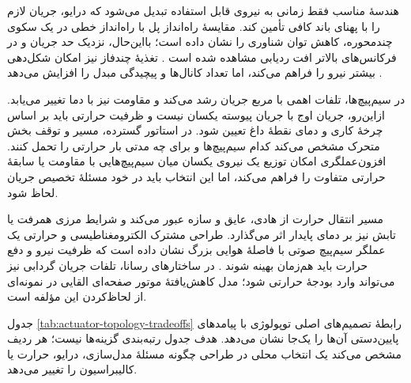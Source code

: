 هندسهٔ مناسب فقط زمانی به نیروی قابل استفاده تبدیل می‌شود که درایو، جریان لازم را با پهنای باند کافی تأمین کند. مقایسهٔ راه‌انداز پل  با راه‌انداز خطی در یک سکوی چندمحوره، کاهش توان شناوری را نشان داده است؛ بااین‌حال، نزدیک حد جریان و در فرکانس‌های بالاتر افت ردیابی مشاهده شده است \cite{huangLowcostHighefficiencyMagnetic2026}. تغذیهٔ چندفاز نیز امکان شکل‌دهی بیشتر نیرو را فراهم می‌کند، اما تعداد کانال‌ها و پیچیدگی مبدل را افزایش می‌دهد \cite{ramettiAnalysisMultiphaseSinglesided2025}.

در سیم‌پیچ‌ها، تلفات اهمی با مربع جریان رشد می‌کند و مقاومت نیز با دما تغییر می‌یابد. ازاین‌رو، جریان اوج با جریان پیوسته یکسان نیست و ظرفیت حرارتی باید بر اساس چرخهٔ کاری و دمای نقطهٔ داغ تعیین شود. در استاتور گسترده، مسیر و توقف بخش متحرک مشخص می‌کند کدام سیم‌پیچ‌ها و برای چه مدتی بار حرارتی را تحمل کنند. افزون‌عملگری امکان توزیع یک نیروی یکسان میان سیم‌پیچ‌هایی با مقاومت یا سابقهٔ حرارتی متفاوت را فراهم می‌کند، اما این انتخاب باید در خود مسئلهٔ تخصیص جریان لحاظ شود.

مسیر انتقال حرارت از هادی، عایق و سازه عبور می‌کند و شرایط مرزی همرفت یا تابش نیز بر دمای پایدار اثر می‌گذارد. طراحی مشترک الکترومغناطیسی و حرارتی یک عملگر سیم‌پیچ صوتی با فاصلهٔ هوایی بزرگ نشان داده است که ظرفیت نیرو و دفع حرارت باید هم‌زمان بهینه شوند \cite{muDesignOptimizationLargeairgap2025}. در ساختارهای رسانا، تلفات جریان گردابی نیز می‌تواند وارد بودجهٔ حرارتی شود؛ مدل کاهش‌یافتهٔ موتور صفحه‌ای القایی در \cite{liElectromagneticAnalysisAxialflux2024} نمونه‌ای از لحاظ‌کردن این مؤلفه است.

جدول \ref{tab:actuator-topology-tradeoffs} رابطهٔ تصمیم‌های اصلی توپولوژی با پیامدهای پایین‌دستی آن‌ها را یک‌جا نشان می‌دهد. هدف جدول رتبه‌بندی گزینه‌ها نیست؛ هر ردیف مشخص می‌کند یک انتخاب محلی در طراحی چگونه مسئلهٔ مدل‌سازی، درایو، حرارت یا کالیبراسیون را تغییر می‌دهد.

